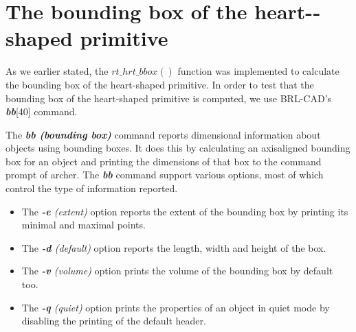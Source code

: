 \clearpage



\section{The bounding box of the heart-­shaped primitive}

As   we   earlier   stated,   the   $rt\_hrt\_bbox()$   function   was   implemented   to
 calculate   the   bounding   box   of   the   heart-­shaped   primitive.   In   order   to   test   that  
the   bounding   box   of   the   heart-­shaped   primitive   is   computed,   we   use  
BRL­-CAD's \textit{\textbf{bb}}[40] command.

\hspace{30} The   \textit{\textbf{bb (bounding box)}}  command   reports   dimensional   information   about   objects   using  
bounding   boxes.   It   does   this   by   calculating   an   axis­aligned   bounding   box   for   an  
object   and   printing   the   dimensions   of   that   box   to   the   command   prompt   of  
archer.   The   \textit{\textbf{bb}}   command   support   various   options,   most   of   which   control   the  
type of information reported.  

\begin{itemize}
\item The \textit{\textbf{-­e} (extent)} option reports the extent of the bounding box by printing its minimal and maximal points.  
\item The \textit{\textbf{-­d} (default)} option reports the length, width and height of the box.  
\item The \textit{\textbf{-­v} (volume)} option prints the volume of the bounding box by default too.  
\item The \textit{\textbf{-­q} (quiet)} option prints the properties of an object in quiet mode by disabling the printing of the default header.
\end{itemize}

